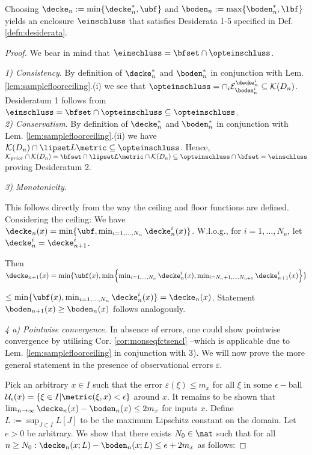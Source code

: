 \begin{thm}
Choosing $\decke_n := \min\{ \decke_n^*, \ubf\}$ and $\boden_n := \max\{\boden_n^*,\lbf\}$ yields an enclosure $\einschluss$ that satisfies Desiderata 1-5 specified in Def. \ref{defn:desiderata}.
\begin{proof}
We bear in mind that $\einschluss = \bfset \cap \opteinschluss$.

\textit{1) Consistency}. By definition of $\decke_n^*$ and $\boden_n^*$ in conjunction with Lem. \ref{lem:samplefloorceiling}.(i) we see that $\opteinschluss = \cap_i \mathcal E_{\boden_n^i}^{\decke_n^i} \subseteq \mathcal K(D_n)$. Desideratum 1 follows from $\einschluss = \bfset \cap \opteinschluss \subseteq \opteinschluss$.\\

\textit{2) Conservatism}. By definition of $\decke_n^*$ and $\boden_n^*$ in conjunction with Lem. \ref{lem:samplefloorceiling}.(ii) we have $\mathcal K(D_n) \cap \lipset L \metric \subseteq \opteinschluss $. Hence, $\mathcal K_{prior} \cap \mathcal K(D_n) =  \bfset \cap \lipset L \metric \cap \mathcal K(D_n) \subseteq \opteinschluss \cap \bfset = \einschluss$ proving
Desideratum 2.

\textit{3) Monotonicity.} 

This follows directly from the way the ceiling and floor functions are defined. Considering the ceiling:
We have $\decke_n (x) = \min\{\ubf,\min_{i =1,...,N_n} \decke^i_{n}(x) \} $. W.l.o.g., for $i=1,\ldots,N_n$, let $\decke_n^i = \decke_{n+1}^{i}$. 

Then 
$\decke_{n+1} (x) = \min\{\ubf(x),\min\Bigl\{ \min_{i =1,...,N_n} \decke^i_{n}(x), \min_{i= N_n +1,\ldots,N_{n+1}}  
\decke^i_{n+1}(x) \Bigr\} \} $

$\leq \min \{\ubf(x), \min_{i =1,...,N_n} \decke^i_{n}(x)  \}=  \decke_{n}(x) $. Statement $\boden_{n+1} (x) \geq  \boden_{n}(x)$ follows analogously.

\textit{4 a) Pointwise convergence.} In absence of errors, one could show pointwise convergence by utilising Cor. \ref{cor:monseqfctsencl} --which is applicable due to Lem. \ref{lem:samplefloorceiling} in conjunction with 3). We will now prove the more general statement in the presence of observational errors $\varepsilon$.

Pick an arbitrary $x \in I$ such that the error $\varepsilon(\xi) \leq m_x$ for all $\xi$ in some $\epsilon-$ball $\mathcal U_\epsilon(x) = \{\xi \in I | \metric(\xi ,x) < \epsilon \}$ around $x$.
It remains to be shown that $\lim_{n\to \infty} \decke_n(x) - \boden_n(x) \leq 2 m_x$ for inputs $x$.
Define $L := \sup_{J \subset I} L[J] $  to be the maximum Lipschitz constant on the domain.
Let $e>0$ be arbitrary. We show that there exists $N_0 \in \nat$ such that for all $n \geq N_0: \decke_n(x;L) - \boden_n(x;L) \leq e + 2 m_x$ as follows:


\end{proof}
\end{thm}
